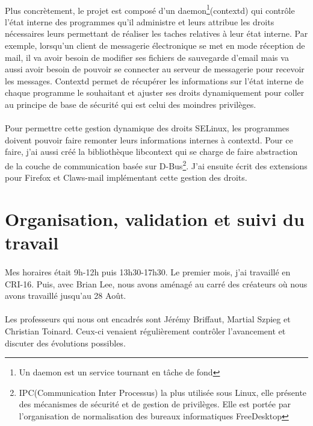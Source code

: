		\paragraph*{}
			Plus concrètement, le projet est composé d'un daemon\footnote{Un daemon est un service tournant en tâche de fond}(contextd) qui contrôle l'état interne des programmes qu'il administre et leurs attribue les droits nécessaires leurs permettant de réaliser les taches relatives à leur état interne.
			Par exemple, lorsqu'un client de messagerie électronique se met en mode réception de mail, il va avoir besoin de  modifier ses fichiers de sauvegarde d'email mais va aussi avoir besoin de pouvoir se connecter au serveur de messagerie pour recevoir les messages. Contextd permet de récupérer les informations sur l'état interne de chaque programme le souhaitant et ajuster ses droits dynamiquement pour coller au principe de base de sécurité qui est celui des moindres privilèges.
			
		\paragraph*{}
			Pour permettre cette gestion dynamique des droits SELinux, les programmes doivent pouvoir faire remonter leurs informations internes à contextd. Pour ce faire, j'ai aussi créé la bibliothèque libcontext qui se charge de faire abstraction de la couche de communication basée sur D-Bus\footnote{IPC(Communication Inter Processus) la plus utilisée sous Linux, elle présente des mécanismes de sécurité et de gestion de privilèges. Elle est portée par l'organisation de normalisation des bureaux informatiques FreeDesktop}. J'ai ensuite écrit des extensions pour Firefox et Claws-mail implémentant cette gestion des droits.

	\section{Organisation, validation et suivi du travail}
		\paragraph*{}
			Mes horaires était 9h-12h puis 13h30-17h30. Le premier mois, j'ai travaillé en CRI-16. Puis, avec Brian Lee, nous avons aménagé au carré des créateurs où nous avons travaillé jusqu'au 28 Août.
			
		\paragraph*{}
			Les professeurs qui nous ont encadrés sont Jérémy Briffaut, Martial Szpieg et Christian Toinard. Ceux-ci venaient régulièrement contrôler l'avancement et discuter des évolutions possibles.
			
